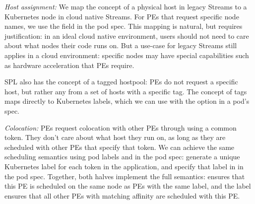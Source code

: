 \emph{Host assignment:} We map the concept of a physical host in legacy Streams
to a Kubernetes node in cloud native Streams. For PEs that request specific
node names, we use the  field in the pod spec.  This mapping is
natural, but requires justification: in an ideal cloud native environment,
users should not need to care about what nodes their code runs on. But a
use-case for legacy Streams still applies in a cloud environment: specific
nodes may have special capabilities such as hardware acceleration that PEs
require.

SPL also has the concept of a tagged hostpool: PEs do not request a specific
host, but rather any from a set of hosts with a specific tag. The concept of
tags maps directly to Kubernetes labels, which we can use with the
 option in a pod's  spec.


\emph{Colocation:} PEs request colocation with other PEs through using a
common token. They don't care about what host they run on, as long as they are
scheduled with other PEs that specify that token. We can achieve the same
scheduling semantics using pod labels and  in the pod spec:
generate a unique Kubernetes label for each token in the application, and
specify that label in  in the pod spec. Together, both halves
implement the full semantics:  ensures that this PE
is scheduled on the same node as PEs with the same label, and the label
ensures that all other PEs with matching affinity are scheduled with this PE.


